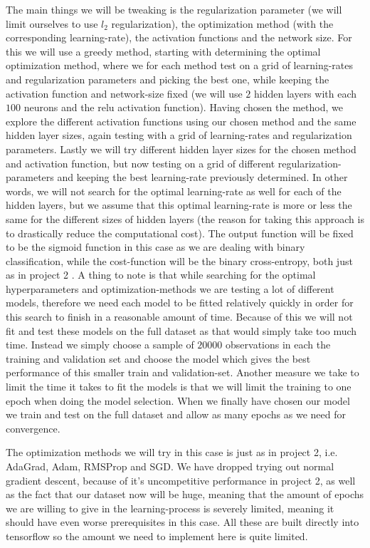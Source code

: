 \documentclass{article}
\begin{document}
The main things we will be tweaking is the regularization parameter (we will
limit ourselves to use $l_2$ regularization), the optimization method (with the
corresponding learning-rate), the activation functions and the network size.
For this we will use a greedy method, starting with determining the optimal
optimization method, where we for each method test on a grid of learning-rates
and regularization parameters and picking the best one, while keeping the
activation function and network-size fixed (we will use $2$ hidden layers with
each $100$ neurons and the relu activation function). Having chosen the method,
we explore the different activation functions using our chosen method and the
same hidden layer sizes, again testing with a grid of learning-rates and
regularization parameters. Lastly we will try different hidden layer sizes for
the chosen method and activation function, but now testing on a grid of
different regularization-parameters and keeping the best learning-rate
previously determined. In other words, we will not search for the optimal
learning-rate as well for each of the hidden layers, but we assume that this
optimal learning-rate is more or less the same for the different sizes of hidden
layers (the reason for taking this approach is to drastically reduce the
computational cost).  The output function will be fixed to be the sigmoid
function in this case as we are dealing with binary classification, while the
cost-function will be the binary cross-entropy, both just as in project 2
\cite{reportproject2}. A thing to note is that while searching for the optimal
hyperparameters and optimization-methods we are testing a lot of different
models, therefore we need each model to be fitted relatively quickly in order
for this search to finish in a reasonable amount of time. Because of this we
will not fit and test these models on the full dataset as that would simply take
too much time. Instead we simply choose a sample of $20000$ observations in each
the training and validation set and choose the model which gives the best
performance of this smaller train and validation-set.  Another measure we take
to limit the time it takes to fit the models is that we will limit the training
to one epoch when doing the model selection.  When we finally have chosen our
model we train and test on the full dataset and allow as many epochs as we need
for convergence.

The optimization methods we will try in this case is just as in project 2, i.e.
AdaGrad, Adam, RMSProp and SGD. We have dropped trying out normal gradient
descent, because of it's uncompetitive performance in project 2, as well as the
fact that our dataset now will be huge, meaning that the amount of epochs we
are willing to give in the learning-process is severely limited, meaning it
should have even worse prerequisites in this case. All these are built directly
into tensorflow so the amount we need to implement here is quite limited.
\end{document}
